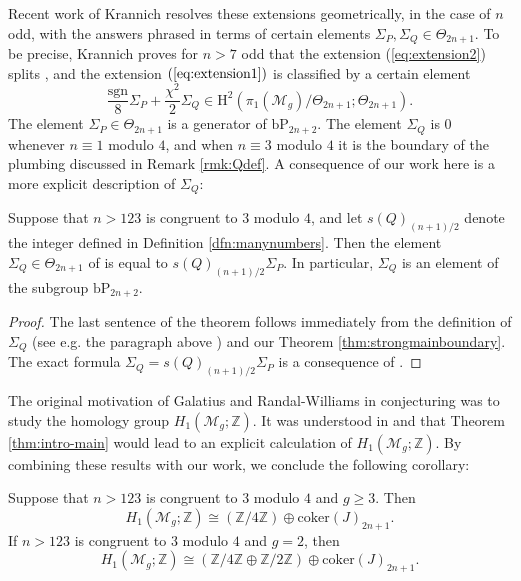 Recent work of Krannich resolves these extensions geometrically, in the case of $n$ odd, with the answers phrased in terms of certain elements $\Sigma_P, \Sigma_Q \in \Theta_{2n+1}$.  To be precise, Krannich proves for $n>7$ odd that the extension (\ref{eq:extension2}) splits \cite[Theorem A]{KrannichMappingClass}, and the extension $(\ref{eq:extension1})$ is classified \cite[Theorem B]{KrannichMappingClass} by a certain element
$$\frac{\mathrm{sgn}}{8} \Sigma_P + \frac{\chi^2}{2} \Sigma_Q \in \mathrm{H}^2\left(\pi_1(\mathcal{M}_g)/\Theta_{2n+1}; \Theta_{2n+1}\right).$$
The element $\Sigma_P \in \Theta_{2n+1}$ is a generator of $\mathrm{bP}_{2n+2}$.  The element $\Sigma_Q$ is $0$ whenever $n \equiv 1$ modulo $4$, and when $n \equiv 3$ modulo $4$ it is the boundary of the plumbing discussed in Remark \ref{rmk:Qdef}.  A consequence of our work here is a more explicit description of $\Sigma_Q$:

\begin{thm}
Suppose that $n>123$ is congruent to $3$ modulo $4$, and let $s(Q)_{(n+1)/2}$ denote the integer defined in Definition \ref{dfn:manynumbers}.  Then the element $\Sigma_Q \in \Theta_{2n+1}$ of \cite[Theorem B]{KrannichMappingClass} is equal to $s(Q)_{(n+1)/2} \Sigma_P$.  In particular, $\Sigma_Q$ is an element of the subgroup $\mathrm{bP}_{2n+2}$.
\end{thm}

\begin{proof}
  The last sentence of the theorem follows immediately from the definition of $\Sigma_Q$ (see e.g. the paragraph above \cite[Theorem B]{KrannichMappingClass}) and our Theorem \ref{thm:strongmainboundary}.  The exact formula $\Sigma_Q = s(Q)_{(n+1)/2} \Sigma_P$ is a consequence of \cite[Lemma 2.7]{KrannichCharacteristic}.
\end{proof}


The original motivation of Galatius and Randal-Williams in conjecturing  was to study the homology group $H_1(\mathcal{M}_g;\mathbb{Z})$.  It was understood in \cite[Theorem 1.3]{GRAbelianQuotients} and \cite[Corollary E]{KrannichMappingClass} that Theorem \ref{thm:intro-main} would lead to an explicit calculation of $H_1(\mathcal{M}_g;\mathbb{Z})$. By combining these results with our work, we conclude the following corollary:

\begin{cor}
Suppose that $n>123$ is congruent to $3$ modulo $4$ and $g \ge 3$.  Then
$$
H_1(\mathcal{M}_g;\mathbb{Z}) \cong  \left(\mathbb{Z}/4\mathbb{Z} \right) \oplus \mathrm{coker}(J)_{2n+1}.
$$
If $n>123$ is congruent to $3$ modulo $4$ and $g=2$, then
$$
H_1(\mathcal{M}_g;\mathbb{Z}) \cong  \left(\mathbb{Z}/4\mathbb{Z} \oplus \mathbb{Z}/2\mathbb{Z} \right) \oplus \mathrm{coker}(J)_{2n+1}.
$$
\end{cor}


